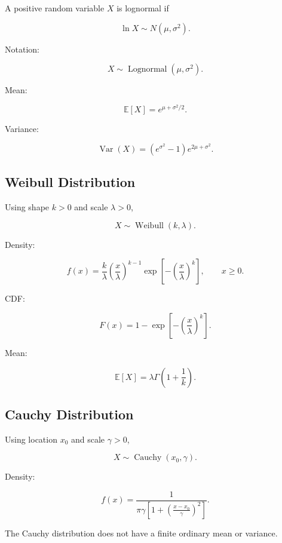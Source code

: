 A positive random variable \(X\) is lognormal if

\[
\boxed{
\ln X
\sim
N(\mu,\sigma^2).
}
\]

Notation:

\[
\boxed{
X
\sim
\operatorname{Lognormal}(\mu,\sigma^2).
}
\]

Mean:

\[
\boxed{
\mathbb{E}[X]
=
e^{\mu+\sigma^2/2}.
}
\]

Variance:

\[
\boxed{
\operatorname{Var}(X)
=
\left(
e^{\sigma^2}-1
\right)
e^{2\mu+\sigma^2}.
}
\]

\subsection{Weibull Distribution}
\label{subsec:weibull-distribution-reference}

Using shape \(k>0\) and scale \(\lambda>0\),

\[
\boxed{
X\sim\operatorname{Weibull}(k,\lambda).
}
\]

Density:

\[
\boxed{
f(x)
=
\frac{k}{\lambda}
\left(
\frac{x}{\lambda}
\right)^{k-1}
\exp
\left[
-
\left(
\frac{x}{\lambda}
\right)^k
\right],
\qquad
x\geq0.
}
\]

CDF:

\[
\boxed{
F(x)
=
1-
\exp
\left[
-
\left(
\frac{x}{\lambda}
\right)^k
\right].
}
\]

Mean:

\[
\boxed{
\mathbb{E}[X]
=
\lambda
\Gamma
\left(
1+\frac1k
\right).
}
\]

\subsection{Cauchy Distribution}
\label{subsec:cauchy-distribution-reference}

Using location \(x_0\) and scale \(\gamma>0\),

\[
\boxed{
X\sim\operatorname{Cauchy}(x_0,\gamma).
}
\]

Density:

\[
\boxed{
f(x)
=
\frac{
1
}{
\pi\gamma
\left[
1+
\left(
\frac{x-x_0}{\gamma}
\right)^2
\right]
}.
}
\]

The Cauchy distribution does not have a finite ordinary mean or variance.

